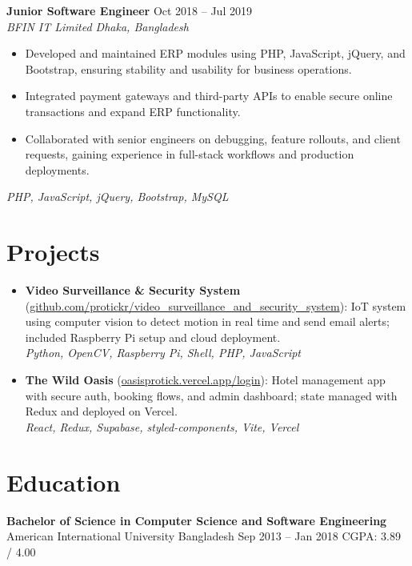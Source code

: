 \documentclass[a4paper,10pt]{article}
\begin{document}
\vspace{1pt}

\textbf{Junior Software Engineer} \hfill Oct 2018 -- Jul 2019\\[-2pt]
\textit{BFIN IT Limited \textbar{} Dhaka, Bangladesh}\\[-4pt]
\begin{itemize}
  \item Developed and maintained ERP modules using PHP, JavaScript, jQuery, and Bootstrap, ensuring stability and usability for business operations.
  \item Integrated payment gateways and third-party APIs to enable secure online transactions and expand ERP functionality.
  \item Collaborated with senior engineers on debugging, feature rollouts, and client requests, gaining experience in full-stack workflows and production deployments.
\end{itemize}
\emph{PHP, JavaScript, jQuery, Bootstrap, MySQL}

\section*{Projects}
\begin{itemize}
  \item \textbf{Video Surveillance \& Security System} (\href{https://github.com/protickr/video_surveillance_and_security_system}{github.com/protickr/video\_surveillance\_and\_security\_system}): IoT system using computer vision to detect motion in real time and send email alerts; included Raspberry Pi setup and cloud deployment.\\
  \emph{Python, OpenCV, Raspberry Pi, Shell, PHP, JavaScript}
  \vspace{1pt}
  \item \textbf{The Wild Oasis} (\href{https://oasisprotick.vercel.app/login}{oasisprotick.vercel.app/login}): Hotel management app with secure auth, booking flows, and admin dashboard; state managed with Redux and deployed on Vercel.\\
  \emph{React, Redux, Supabase, styled-components, Vite, Vercel}
\end{itemize}

\section*{Education}
\textbf{Bachelor of Science in Computer Science and Software Engineering}\\
American International University Bangladesh \hfill Sep 2013 -- Jan 2018 \hspace{1em} CGPA: 3.89 / 4.00
\end{document}

